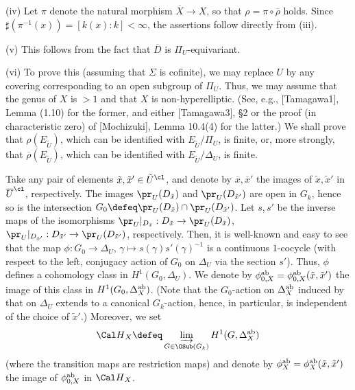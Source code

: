 \noindent
(iv) Let $\pi$ denote the natural morphism ${\overline X}\to X$, 
so that $\rho=\pi\circ {\overline \rho}$ holds. Since 
$\sharp(\pi^{-1}(x))=[k(x):k]<\infty$, the assertions follow 
directly from (iii). 

\noindent
(v) This follows from the fact that $\overline{D}$ is 
$\Pi_U$-equivariant. 

\noindent
(vi) To prove this (assuming that $\Sigma$ is cofinite),  we may replace 
$U$ by any covering corresponding to an open subgroup of $\Pi_U$. 
Thus, we may assume that the genus of $X$ is $>1$ and that 
$X$ is non-hyperelliptic. (See, e.g., [Tamagawa1], Lemma (1.10) 
for the former, 
and either [Tamagawa3], \S 2 or the proof (in characteristic zero) 
of [Mochizuki], Lemma 10.4(4) for the latter.) We shall prove 
that $\rho(E_{\tilde U})$, which can be identified with 
$E_{\tilde U}/\Pi_U$, is finite, or, more strongly, that 
${\overline \rho}(E_{\tilde U})$, which can be identified with 
$E_{\tilde U}/\Delta_U$, is finite. 

Take any pair of elements 
${\tilde x}, {\tilde x}'\in {\tilde U}^{\cl}$, 
and denote by ${\overline x},{\overline x}'$ the images of 
${\tilde x}, {\tilde x}'$ in ${\overline U}^{\cl}$, respectively. 
The images $\pr_U(D_{\tilde x})$ and $\pr_U(D_{{\tilde x}'})$ 
are open in $G_{k}$, hence so is the 
intersection $G_0\defeq
\pr_U(D_{\tilde x})\cap\pr_U(D_{{\tilde x}'})$. 
Let $s,s'$ be the inverse maps of the isomorphisms 
$\pr_U|_{D_{\tilde x}}: D_{\tilde x}\to \pr_U(D_{\tilde x})$, 
$\pr_U|_{D_{{\tilde x}'}}: D_{{\tilde x}'}\to \pr_U(D_{{\tilde x}'})$, 
respectively. Then, it is well-known and easy to see that 
the map $\phi: G_0\to\Delta_U$, 
$\gamma\mapsto s(\gamma)s'(\gamma)^{-1}$ 
is a continuous $1$-cocycle (with respect to 
the left, conjugacy action of $G_0$ on $\Delta_U$ via 
the section $s'$). Thus, $\phi$ defines a cohomology class 
in $H^1(G_0, \Delta_U)$. We denote by 
$\phi_{0,X}^{\operatorname {ab}}=\phi_{0,X}^{\operatorname {ab}}(\tilde x,\tilde x')$ 
the image of 
this class in $H^1(G_0, \Delta_{X}^{\operatorname {ab}})$. 
(Note that the $G_0$-action on 
$\Delta_{X}^{\operatorname {ab}}$ induced by that on $\Delta_U$ 
extends to a canonical $G_{k}$-action, 
hence, in particular, is independent of the choice 
of ${\tilde x}'$.) Moreover, we set 
$${\Cal H}_X\defeq 
\varinjlim_{G\in\OSub(G_k)}
H^1(G, \Delta_{X}^{\ab})$$
(where the transition maps are restriction maps)
and denote by $\phi_X^{\operatorname {ab}}=\phi_X^{\operatorname {ab}}({\tilde x},{\tilde x}')$ 
the image of $\phi_{0,X}^{\operatorname {ab}}$ in ${\Cal H}_X$. 

